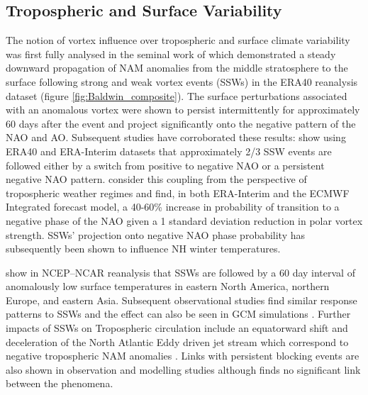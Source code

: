 \subsection{Tropospheric and Surface Variability}
The notion of vortex influence over tropospheric and surface climate variability was first fully analysed in the seminal work of \cite{baldwinStratospheric2001a} which demonstrated a steady downward propagation of NAM anomalies from the middle stratosphere to the surface following strong and weak vortex events (SSWs) in the ERA40 reanalysis dataset (figure \ref{fig:Baldwin_composite}). The surface perturbations associated with an anomalous vortex were shown to persist intermittently for approximately 60 days after the event and project significantly onto the negative pattern of the NAO and AO. Subsequent studies have corroborated these results: \cite{domeisenEstimating2019d} show using ERA40 and ERA-Interim datasets that approximately 2/3 SSW events are followed either by a switch from positive to negative NAO or a persistent negative NAO pattern. \cite{charlton-perezInfluence2018e} consider this coupling from the perspective of tropospheric weather regimes and find, in both ERA-Interim and the ECMWF Integrated forecast model, a 40-60\% increase in probability of transition to a negative phase of the NAO given a 1 standard deviation reduction in polar vortex strength. SSWs' projection onto negative NAO phase probability has subsequently been shown to influence NH winter temperatures.

\cite{thompsonStratospheric2002b} show in NCEP–NCAR reanalysis that SSWs are followed by a 60 day interval of anomalously low surface temperatures in eastern North America, northern Europe, and eastern Asia. Subsequent observational studies find similar response patterns to SSWs \citep{kolstadAssociation2010b, kingObserved2019b, lehtonenObserved2016b} and the effect can also be seen in GCM simulations \citep{tomassiniRole2012b, lehtonenObserved2016b}. Further impacts of SSWs on Tropospheric circulation include an equatorward shift and deceleration of the North Atlantic Eddy driven jet stream which correspond to negative tropospheric NAM anomalies \citep{hitchcockDownward2014b,maycockRegime2020b}. Links with persistent blocking events are also shown in observation and modelling studies \citep{daviniBlocking2014b, vialSudden2013b} although \cite{taguchiThere2008b} finds no significant link between the phenomena.

